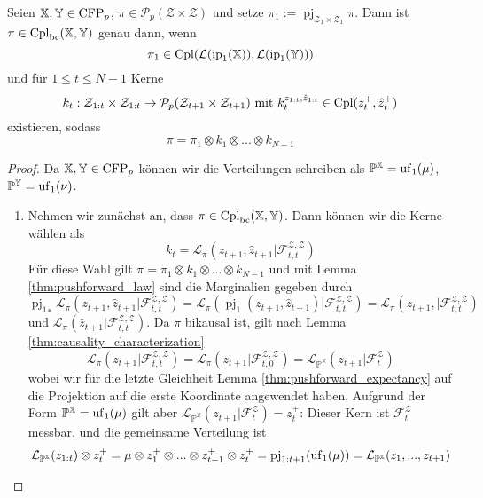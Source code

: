 \begin{lemma} \label{thm:causality_kernel_characterization}
Seien $\mathbb{X}, \mathbb{Y} \in \operatorname{CFP}_p$, $\pi \in \mathcal{P}_p(\mathcal{Z}\times\mathcal{Z})$ und setze $\pi_1 := \operatorname{pj}_{\mathcal{Z}_1\times \mathcal{Z}_1}\pi$. Dann ist $\pi \in \operatorname{Cpl}_{\operatorname{bc}}(\mathbb{X}, \mathbb{Y})$ genau dann, wenn
$$\pi_1 \in \operatorname{Cpl}(\mathcal{L}(\operatorname{ip}_1(\mathbb{X})), \mathcal{L}(\operatorname{ip}_1(\mathbb{Y})))$$
und für $1\leq t \leq N-1$ Kerne
$$k_t:\mathcal{Z}_{1:t} \times \mathcal{Z}_{1:t} \rightarrow \mathcal{P}_p(\mathcal{Z}_{t+1} \times \mathcal{Z}_{t+1}) \text{ mit } k_t^{z_{1:t}, \hat{z}_{1:t}} \in \operatorname{Cpl}(z_t^+, \hat{z}_t^+)$$
existieren, sodass
$$\pi = \pi_1 \otimes k_1 \otimes ... \otimes k_{N-1}$$
\end{lemma}
\begin{proof}
Da $\mathbb{X}, \mathbb{Y} \in \operatorname{CFP}_p$ können wir die Verteilungen schreiben als $\mathbb{P}^{\mathbb{X}} = \operatorname{uf}_1(\mu)$, $\mathbb{P}^{\mathbb{Y}}=\operatorname{uf}_1(\nu)$.
\begin{enumerate}
\item
Nehmen wir zunächst an, dass $\pi \in \operatorname{Cpl}_{\operatorname{bc}}(\mathbb{X}, \mathbb{Y})$. Dann können wir die Kerne wählen als 
$$k_t = \mathcal{L}_\pi(z_{t+1}, \hat{z}_{t+1} \vert \mathcal{F}_{t,t}^{\mathcal{Z}, \mathcal{Z}})$$
Für diese Wahl gilt $\pi = \pi_1 \otimes k_1 \otimes ... \otimes k_{N-1}$ und mit Lemma \ref{thm:pushforward_law} sind die Marginalien gegeben durch 
$${\operatorname{pj}_1}_*\mathcal{L}_\pi(z_{t+1}, \hat{z}_{t+1} \vert \mathcal{F}_{t,t}^{\mathcal{Z}, \mathcal{Z}}) = \mathcal{L}_\pi(\operatorname{pj}_1(z_{t+1}, \hat{z}_{t+1}) \vert \mathcal{F}_{t,t}^{\mathcal{Z}, \mathcal{Z}}) = \mathcal{L}_\pi(z_{t+1},  \vert \mathcal{F}_{t,t}^{\mathcal{Z}, \mathcal{Z}})$$
und $\mathcal{L}_\pi(\hat{z}_{t+1} \vert \mathcal{F}_{t,t}^{\mathcal{Z},\mathcal{Z}})$. Da $\pi$ bikausal ist, gilt nach Lemma \ref{thm:causality_characterization} 
$$\mathcal{L}_\pi(z_{t+1} \vert \mathcal{F}_{t,t}^{\mathcal{Z,Z}}) = \mathcal{L}_\pi(z_{t+1} \vert \mathcal{F}_{t,0}^{\mathcal{Z,Z}})=\mathcal{L}_{\mathbb{P}^{\mathbb{X}}}(z_{t+1} \vert \mathcal{F}_t^\mathcal{Z})$$
wobei wir für die letzte Gleichheit Lemma \ref{thm:pushforward_expectancy} auf die Projektion auf die erste Koordinate angewendet haben. Aufgrund der Form $\mathbb{P}^{\mathbb{X}} = \operatorname{uf}_1(\mu)$ gilt aber $\mathcal{L}_{\mathbb{P}^{\mathbb{X}}}(z_{t+1} \vert \mathcal{F}_t^{\mathcal{Z}}) = z_t^+$: Dieser Kern ist $\mathcal{F}_t^{\mathcal{Z}}$ messbar, und die gemeinsame Verteilung ist 
$$\mathcal{L}_{\mathbb{P}^{\mathbb{X}}}(z_{1:t}) \otimes z_t^+ = \mu \otimes z_1^+ \otimes ... \otimes z_{t-1}^+  \otimes z_t^+ = \operatorname{pj}_{1:t+1}(\operatorname{uf}_1(\mu)) = \mathcal{L}_{\mathbb{P}^{\mathbb{X}}}(z_1,...,z_{t+1})$$

\end{enumerate}
\end{proof}
